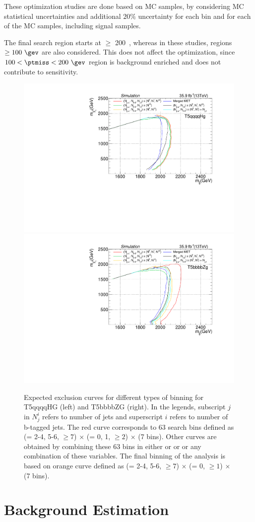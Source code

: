 These optimization studies are done based on MC samples, by considering MC statistical uncertainties and additional $20\%$ uncertainty for each bin and for each of the MC samples, including signal samples.

The final search region starts at \ptmiss $\geq$ 200~\gev, whereas in these studies, regions $\geq 100~\gev$ are also considered. This does not affect the optimization, since $100 < \ptmiss < 200~\gev$ region is background enriched and does not contribute to sensitivity.

\begin{figure}[h!]
\centering
\includegraphics[width=0.48\linewidth]{../Figures/Chap3/optimization/T5qqqqHg_Optimization.pdf}
\includegraphics[width=0.48\linewidth]{../Figures/Chap3/optimization/T5bbbbZg_Optimization.pdf}
\captionsetup{width=.9\linewidth}
\caption[Optimization of bins using MC]{Expected exclusion curves for different types of binning for T5qqqqHG (left) and T5bbbbZG (right). In the legends, subscript $j$ in $N^i_j$ refers to number of jets and superscript $i$ refers to number of b-tagged jets. The red curve corresponds to 63 search bins defined as (\nj = 2-4, 5-6, $\geq 7$) $\times$ (\nb = 0, 1, $\geq2$) $\times$ (7 \ptmiss bins). Other curves are obtained by combining these 63 bins in either \nj or \nb or \ptmiss or any combination of these variables. The final binning of the analysis is based on  orange curve defined as (\nj = 2-4, 5-6, $\geq 7$) $\times$ (\nb = 0, $\geq1$) $\times$ (7 \ptmiss bins).}
\label{fig:optCurves}
\end{figure}

\section{Background Estimation}
\label{sec:bkgestimation}

